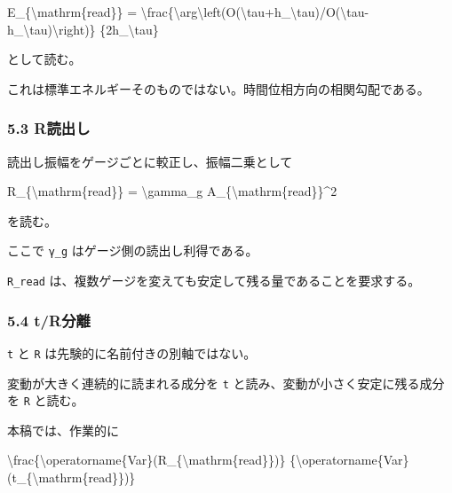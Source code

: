 \documentclass[
  a4paper,
]{article}
\newenvironment{Shaded}{}{}
\newcommand{\NormalTok}[1]{#1}
\begin{document}
\begin{Shaded}
\begin{Highlighting}[]
\NormalTok{E\_\{\textbackslash{}mathrm\{read\}\}}
\NormalTok{=}
\NormalTok{\textbackslash{}frac\{\textbackslash{}arg\textbackslash{}left(O(\textbackslash{}tau+h\_\textbackslash{}tau)/O(\textbackslash{}tau{-}h\_\textbackslash{}tau)\textbackslash{}right)\}}
\NormalTok{\{2h\_\textbackslash{}tau\}}
\end{Highlighting}
\end{Shaded}

として読む。

これは標準エネルギーそのものではない。時間位相方向の相関勾配である。

\subsubsection{5.3 R読出し}\label{rux8aadux51faux3057}

読出し振幅をゲージごとに較正し、振幅二乗として

\begin{Shaded}
\begin{Highlighting}[]
\NormalTok{R\_\{\textbackslash{}mathrm\{read\}\}}
\NormalTok{=}
\NormalTok{\textbackslash{}gamma\_g A\_\{\textbackslash{}mathrm\{read\}\}\^{}2}
\end{Highlighting}
\end{Shaded}

を読む。

ここで \texttt{γ\_g} はゲージ側の読出し利得である。

\texttt{R\_read}
は、複数ゲージを変えても安定して残る量であることを要求する。

\subsubsection{5.4 t/R分離}\label{trux5206ux96e2}

\texttt{t} と \texttt{R} は先験的に名前付きの別軸ではない。

変動が大きく連続的に読まれる成分を \texttt{t}
と読み、変動が小さく安定に残る成分を \texttt{R} と読む。

本稿では、作業的に

\begin{Shaded}
\begin{Highlighting}[]
\NormalTok{\textbackslash{}frac\{\textbackslash{}operatorname\{Var\}(R\_\{\textbackslash{}mathrm\{read\}\})\}}
\NormalTok{\{\textbackslash{}operatorname\{Var\}(t\_\{\textbackslash{}mathrm\{read\}\})\}}
\end{Highlighting}
\end{Shaded}
\end{document}
